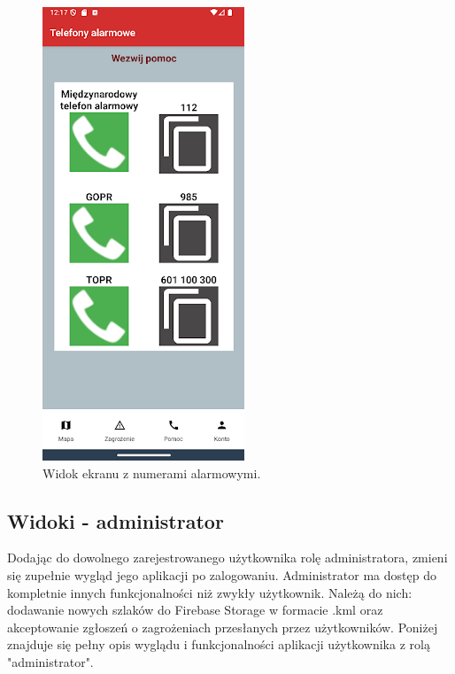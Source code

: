 \begin{figure}[H]
    \centering
    \includegraphics[scale=0.6]{img/imp/widok-telefony.png}
    \caption{Widok ekranu z numerami alarmowymi.}
    \label{widok:telefony}
\end{figure}

\subsection{Widoki - administrator}
Dodając do dowolnego zarejestrowanego użytkownika rolę administratora, zmieni się zupełnie wygląd jego aplikacji po zalogowaniu. Administrator ma dostęp do kompletnie innych funkcjonalności niż zwykły użytkownik. Należą do nich: dodawanie nowych szlaków do Firebase Storage w formacie .kml oraz akceptowanie zgłoszeń o zagrożeniach przesłanych przez użytkowników. Poniżej znajduje się pełny opis wyglądu i funkcjonalności aplikacji użytkownika z rolą "administrator".

